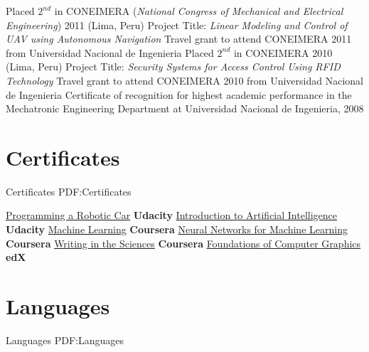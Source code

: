 \documentclass[letterpaper,MMMyyyy,nonstop]{simpleresumecv}
\begin{document}
\begin{body}
\GapNoBreak
\BulletItem
Placed $2^{nd}$ in CONEIMERA (\textit{National Congress of Mechanical and Electrical Engineering}) 2011 (Lima, Peru)
\SubBulletItem
Project Title: \textit{Linear Modeling and Control of UAV using Autonomous Navigation}
\GapNoBreak
\BulletItem
Travel grant to attend CONEIMERA 2011 from Universidad Nacional de Ingenieria
\GapNoBreak
\BulletItem
Placed $2^{nd}$ in CONEIMERA 2010 (Lima, Peru)
\SubBulletItem
Project Title: \textit{Security Systems for Access Control Using RFID Technology}
\GapNoBreak
\BulletItem
Travel grant to attend CONEIMERA 2010 from Universidad Nacional de Ingenieria
\GapNoBreak
\BulletItem
Certificate of recognition for highest academic performance in the Mechatronic Engineering Department at Universidad Nacional de Ingenieria, 2008


\section
{Certificates}
{Certificates}
{PDF:Certificates}

\GapNoBreak
\BulletItem
\href{https://github.com/davidlavy88/resume/blob/master/Certificates/robotic-car-certificate.pdf}
{Programming a Robotic Car}
\hfill
\textbf{Udacity}
\GapNoBreak
\BulletItem
\href{https://github.com/davidlavy88/resume/blob/master/Certificates/artificial-intelligence-certificate.pdf}
{Introduction to Artificial Intelligence}
\hfill
\textbf{Udacity}
\GapNoBreak
\BulletItem
\href{https://github.com/davidlavy88/resume/blob/master/Certificates/machine-learning-certificate.pdf}
{Machine Learning}
\hfill
\textbf{Coursera}
\GapNoBreak
\BulletItem
\href{https://github.com/davidlavy88/resume/blob/master/Certificates/nn-for-ml-certificate.pdf}
{Neural Networks for Machine Learning}
\hfill
\textbf{Coursera}
\GapNoBreak
\BulletItem
\href{https://github.com/davidlavy88/resume/blob/master/Certificates/writing-in-sciences-certificate.pdf}
{Writing in the Sciences}
\hfill
\textbf{Coursera}
\GapNoBreak
\BulletItem
\href{https://github.com/davidlavy88/resume/blob/master/Certificates/cs184-certificate.pdf}
{Foundations of Computer Graphics}
\hfill
\textbf{edX}


\section
{Languages}
{Languages}
{PDF:Languages}


\end{body}
\end{document}
